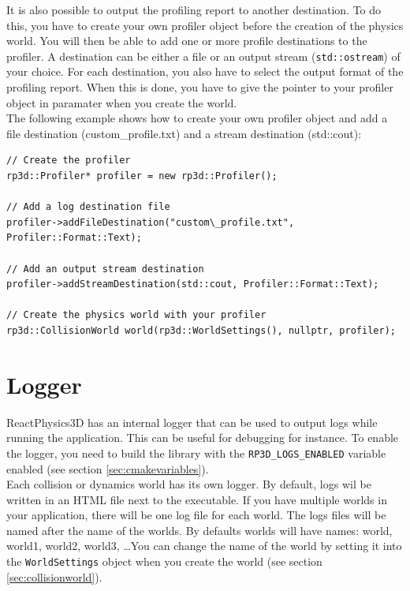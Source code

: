 \documentclass[a4paper,12pt]{article}
\begin{document}
    It is also possible to output the profiling report to another destination. To do this,
    you have to create your own profiler object before the creation of the physics world. You will then be able to add one or more profile destinations
    to the profiler. A destination can be either a file or an output stream (\texttt{std::ostream}) of your choice. For each destination, you also
    have to select the output format of the profiling report. When this is done, you have to give the pointer to your profiler object in paramater
    when you create the world. \\

    The following example shows how to create your own profiler object and add a file destination (custom\_profile.txt) and a stream destination (std::cout): \\

    \begin{lstlisting}
// Create the profiler
rp3d::Profiler* profiler = new rp3d::Profiler();

// Add a log destination file
profiler->addFileDestination("custom\_profile.txt", Profiler::Format::Text);

// Add an output stream destination 
profiler->addStreamDestination(std::cout, Profiler::Format::Text);

// Create the physics world with your profiler
rp3d::CollisionWorld world(rp3d::WorldSettings(), nullptr, profiler);
    \end{lstlisting}

    \section{Logger}
    \label{sec:logger}

    ReactPhysics3D has an internal logger that can be used to output logs while running the application. This can be useful for debugging for instance.
    To enable the logger, you need to build the library with the \texttt{RP3D\_LOGS\_ENABLED} variable enabled (see section \ref{sec:cmakevariables}). \\

    Each collision or dynamics world has its own logger. By default, logs wil be written in an HTML file next to the executable.
    If you have multiple worlds in your application, there will be one log file for each world. The logs files will be named after the
    name of the worlds. By defaults worlds will have names: world, world1, world2, world3, \dots You can change the name of the world by
    setting it into the \texttt{WorldSettings} object when you create the world (see section \ref{sec:collisionworld}). \\
\end{document}
